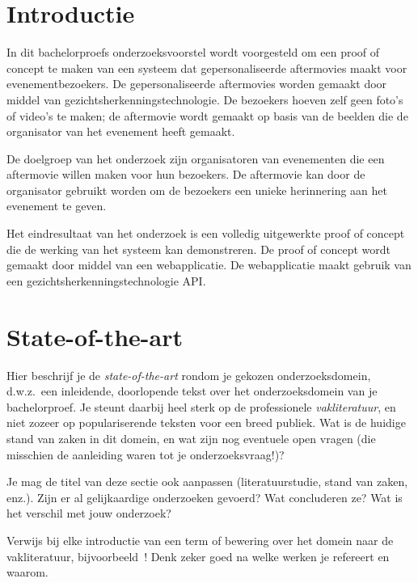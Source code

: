 
\section{Introductie}%
\label{sec:introductie}

In dit bachelorproefs onderzoeksvoorstel wordt voorgesteld om een proof of concept te maken van een systeem dat gepersonaliseerde 
aftermovies maakt voor evenementbezoekers. De gepersonaliseerde aftermovies worden gemaakt door middel van gezichtsherkenningstechnologie.
De bezoekers hoeven zelf geen foto's of video's te maken; de aftermovie wordt gemaakt op basis van de beelden die de organisator van het evenement heeft gemaakt.

De doelgroep van het onderzoek zijn organisatoren van evenementen die een aftermovie willen maken voor hun bezoekers.
De aftermovie kan door de organisator gebruikt worden om de bezoekers een unieke herinnering aan het evenement te geven.

Het eindresultaat van het onderzoek is een volledig uitgewerkte proof of concept die de werking van het systeem kan demonstreren.
De proof of concept wordt gemaakt door middel van een webapplicatie. De webapplicatie maakt gebruik van een gezichtsherkenningstechnologie API.


\section{State-of-the-art}%
\label{sec:state-of-the-art}

Hier beschrijf je de \emph{state-of-the-art} rondom je gekozen onderzoeksdomein, d.w.z.\ een inleidende, doorlopende tekst over het onderzoeksdomein van je bachelorproef. Je steunt daarbij heel sterk op de professionele \emph{vakliteratuur}, en niet zozeer op populariserende teksten voor een breed publiek. Wat is de huidige stand van zaken in dit domein, en wat zijn nog eventuele open vragen (die misschien de aanleiding waren tot je onderzoeksvraag!)?

Je mag de titel van deze sectie ook aanpassen (literatuurstudie, stand van zaken, enz.). Zijn er al gelijkaardige onderzoeken gevoerd? Wat concluderen ze? Wat is het verschil met jouw onderzoek?

Verwijs bij elke introductie van een term of bewering over het domein naar de vakliteratuur, bijvoorbeeld~\autocite{Hykes2013}! Denk zeker goed na welke werken je refereert en waarom.

